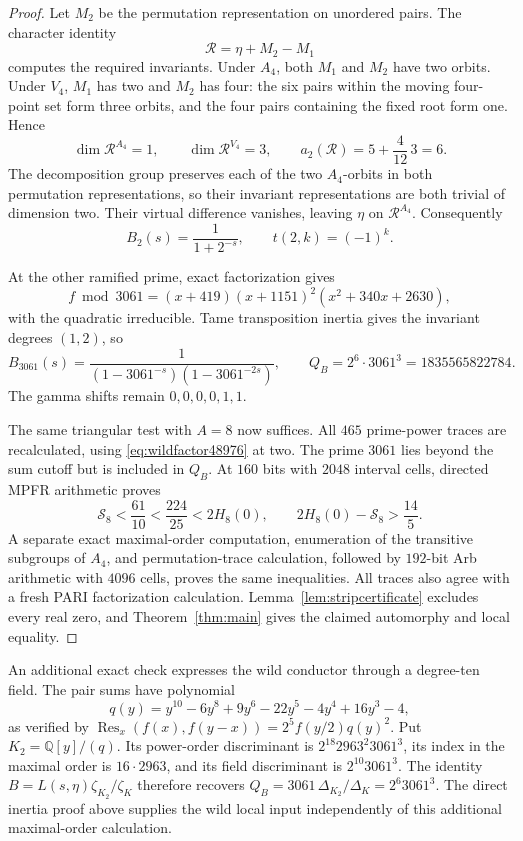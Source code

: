 \documentclass[11pt]{article}
\theoremstyle{definition}
\theoremstyle{remark}
\newcommand{\Q}{\mathbb Q}
\numberwithin{equation}{section}
\begin{document}
\begin{proof}
Let $M_2$ be the permutation representation on unordered pairs. The character identity
\[
\mathcal R=\eta+M_2-M_1
\]
computes the required invariants. Under $A_4$, both $M_1$ and $M_2$ have two orbits. Under $V_4$, $M_1$ has two and $M_2$ has four: the six pairs within the moving four-point set form three orbits, and the four pairs containing the fixed root form one. Hence
\[
\dim\mathcal R^{A_4}=1,\qquad
\dim\mathcal R^{V_4}=3,\qquad
 a_2(\mathcal R)=5+\frac4{12}\,3=6.
\]
The decomposition group preserves each of the two $A_4$-orbits in both permutation representations, so their invariant representations are both trivial of dimension two. Their virtual difference vanishes, leaving $\eta$ on $\mathcal R^{A_4}$. Consequently
\begin{equation}\label{eq:wildfactor48976}
B_2(s)=\frac1{1+2^{-s}},\qquad t(2,k)=(-1)^k.
\end{equation}

At the other ramified prime, exact factorization gives
\[
f\bmod3061=(x+419)(x+1151)^2(x^2+340x+2630),
\]
with the quadratic irreducible. Tame transposition inertia gives the invariant degrees $(1,2)$, so
\[
B_{3061}(s)=\frac1{(1-3061^{-s})(1-3061^{-2s})},
\qquad Q_B=2^6\cdot3061^3=1835565822784.
\]
The gamma shifts remain $0,0,0,0,1,1$.

The same triangular test with $A=8$ now suffices. All $465$ prime-power traces are recalculated, using \eqref{eq:wildfactor48976} at two. The prime $3061$ lies beyond the sum cutoff but is included in $Q_B$. At $160$ bits with $2048$ interval cells, directed MPFR arithmetic proves
\begin{equation}\label{eq:bounds48976}
\mathcal S_8<\frac{61}{10}<\frac{224}{25}<2H_8(0),
\qquad 2H_8(0)-\mathcal S_8>\frac{14}{5}.
\end{equation}
A separate exact maximal-order computation, enumeration of the transitive subgroups of $A_4$, and permutation-trace calculation, followed by $192$-bit Arb arithmetic with $4096$ cells, proves the same inequalities. All traces also agree with a fresh PARI factorization calculation. Lemma~\ref{lem:stripcertificate} excludes every real zero, and Theorem~\ref{thm:main} gives the claimed automorphy and local equality.
\end{proof}

An additional exact check expresses the wild conductor through a degree-ten field. The pair sums have polynomial
\[
q(y)=y^{10}-6y^8+9y^6-22y^5-4y^4+16y^3-4,
\]
as verified by
$\operatorname{Res}_x(f(x),f(y-x))=2^5f(y/2)q(y)^2$.
Put $K_2=\Q[y]/(q)$. Its power-order discriminant is $2^{18}2963^2 3061^3$, its index in the maximal order is $16\cdot2963$, and its field discriminant is $2^{10}3061^3$. The identity $B=L(s,\eta)\zeta_{K_2}/\zeta_K$ therefore recovers $Q_B=3061\,\Delta_{K_2}/\Delta_K=2^6 3061^3$. The direct inertia proof above supplies the wild local input independently of this additional maximal-order calculation.
\end{document}
